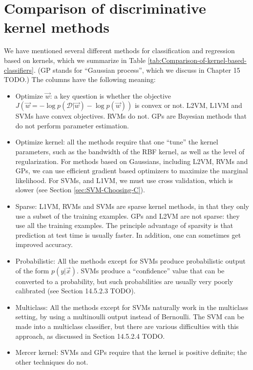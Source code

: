 \section{Comparison of discriminative kernel methods}
We have mentioned several different methods for classification and regression based on kernels, which we summarize in Table \ref{tab:Comparison-of-kernel-based-classifiers}. (GP stands for “Gaussian process”, which we discuss in Chapter 15 TODO.) The columns have the following meaning:
\begin{itemize}
\item{Optimize $\vec{w}$: a key question is whether the objective $J(\vec{w}=-\log p(\mathcal{D}|\vec{w})-\log p(\vec{w}))$ is convex or not. L2VM, L1VM and SVMs have convex objectives. RVMs do not. GPs are Bayesian methods that do not perform parameter estimation.}
\item{Optimize kernel: all the methods require that one “tune” the kernel parameters, such as the bandwidth of the RBF kernel, as well as the level of regularization. For methods based on Gaussians, including L2VM, RVMs and GPs, we can use efficient gradient based optimizers to maximize the marginal likelihood. For SVMs, and L1VM, we must use cross validation, which is slower (see Section \ref{sec:SVM-Choosing-C}).}
\item{Sparse: L1VM, RVMs and SVMs are sparse kernel methods, in that they only use a subset of the training examples. GPs and L2VM are not sparse: they use all the training examples. The principle advantage of sparsity is that prediction at test time is usually faster. In addition, one can sometimes get improved accuracy.}
\item{Probabilistic: All the methods except for SVMs produce probabilistic output of the form $p(y|\vec{x})$. SVMs produce a “confidence” value that can be converted to a probability, but such probabilities are usually very poorly calibrated (see Section 14.5.2.3 TODO).}
\item{Multiclass: All the methods except for SVMs naturally work in the multiclass setting, by using a multinoulli output instead of Bernoulli. The SVM can be made into a multiclass classifier, but there are various difficulties with this approach, as discussed in Section 14.5.2.4 TODO.}
\item{Mercer kernel: SVMs and GPs require that the kernel is positive definite; the other techniques do not.}
\end{itemize}

